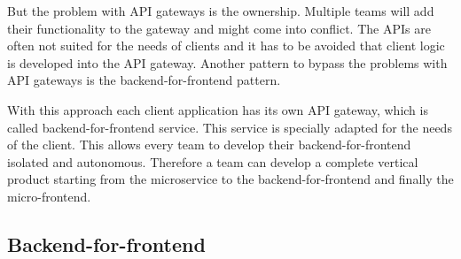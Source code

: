 But the problem with API gateways is the ownership. Multiple teams will add their functionality to the gateway and might come into conflict. The APIs are often not suited for the needs of clients and it has to be avoided that client logic is developed into the API gateway. Another pattern to bypass the problems with API gateways is the backend-for-frontend pattern. \cite{book:2018:richardson:background:bff:microservices-patterns}

With this approach each client application has its own API gateway, which is called backend-for-frontend service. This service is specially adapted for the needs of the client. \cite{book:2018:richardson:background:bff:microservices-patterns} \cite{book:2021:newman:background:bff:micro-services} This allows every team to develop their backend-for-frontend isolated and autonomous. Therefore a team can develop a complete vertical product starting from the microservice to the backend-for-frontend and finally the micro-frontend. \cite{book:2020:geers:background:micro-frontends:micro-frontends-in-action}

\subsection{Backend-for-frontend}
